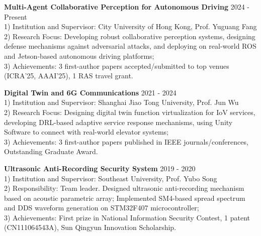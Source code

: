 \documentclass[letterpaper,11pt]{article}
\begin{document}
{{{{{{\begin{justify}
\normalsize
\textbf{Multi-Agent Collaborative Perception for Autonomous Driving}\cftdotfill{\cftdotsep} 2024 - Present\\
1) Institution and Supervisor: City University of Hong Kong, Prof. Yuguang Fang\\
\vspace{0.5mm}
2) Research Focus: Developing robust collaborative perception systems, designing defense mechanisms against adversarial attacks, and deploying on real-world ROS and Jetson-based autonomous driving platforms;\\
\vspace{0.5mm}
3) Achievements: 3 first-author papers accepted/submitted to top venues (ICRA'25, AAAI'25), 1 RAS travel grant.
\vspace{3.5mm}

\textbf{Digital Twin and 6G Communications}\cftdotfill{\cftdotsep} 2021 - 2024\\
1) Institution and Supervisor: Shanghai Jiao Tong University, Prof. Jun Wu\\
\vspace{0.5mm}
2) Research Focus: Designing digital twin function virtualization for IoV services, developing DRL-based adaptive service response mechanisms, using Unity Software to connect with real-world elevator systems;\\
\vspace{0.5mm}
3) Achievements: 3 first-author papers published in IEEE journals/conferences, Outstanding Graduate Award.
\vspace{3.5mm}

\textbf{Ultrasonic Anti-Recording Security System}\cftdotfill{\cftdotsep} 2019 - 2020\\
1) Institution and Supervisor: Southeast University, Prof. Yubo Song\\
\vspace{0.5mm}
2) Responsibility: Team leader. Designed ultrasonic anti-recording mechanism based on acoustic parametric array; Implemented SM4-based spread spectrum and DDS waveform generation on STM32F407 microcontroller;\\
\vspace{0.5mm}
3) Achievements: First prize in National Information Security Contest, 1 patent (CN111064543A), Sun Qingyun Innovation Scholarship.
\end{justify}



}}}}}}
\end{document}
